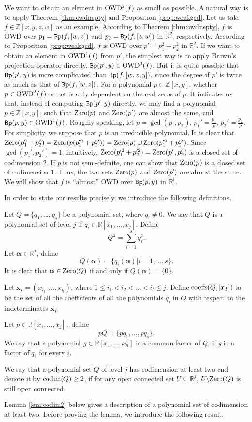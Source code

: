 \documentclass[amsthm]{elsart}
\def \coeffs{{\rm coeffs}}
\def \codim {{\rm codim}}
\def \OWD  {{\rm OWD}}
\def \Bproj  {{\tt Bp}}
\def  \zero {{\rm Zero}}
\def \RR {{\mathbb R}}
\def \ZZ {{\mathbb Z}}
\begin{document}
We want to obtain an element in $\OWD^j(f)$ as small as possible. A natural way is to apply Theorem \ref{thm:owdnepty} and Proposition \ref{prop:weakgcd}. Let us take $f\in\ZZ[x,y,z,w]$ as an example. According to Theorem \ref{thm:owdnepty}, $f$ is OWD over $p_1=\Bproj(f,[w,z])$ and $p_2=\Bproj(f,[z,w])$ in $\RR^2$, respectively. According to Proposition \ref{prop:weakgcd}, $f$ is OWD over $p'=p_1^2+p_2^2$ in $\RR^2$.
If we want to obtain an element in $\OWD^1(f)$ from $p'$, the simplest way is to apply Brown's projection operator directly, $\Bproj(p',y)\in\OWD^1(f)$. But it is quite possible that $\Bproj(p',y)$ is more complicated than $\Bproj(f,[w,z,y])$, since the degree of $p'$ is twice as much as that of $\Bproj(f,[w,z])$.
For a polynomial $p\in\ZZ[x,y]$, whether $p\in\OWD^2(f)$ or not is only dependent on the real zeros of $p$. It indicates us that, instead of computing $\Bproj(p',y)$ directly, we may find a polynomial $p\in\ZZ[x,y]$, such that $\zero(p)$ and $\zero(p')$ are almost the same, and $\Bproj(p,y)\in\OWD^1(f)$. Roughly speaking, let $p=\gcd(p_1,p_2)$, $p_1'=\frac{p_1}{p}$, $p_2'=\frac{p_2}{p}$. For simplicity, we suppose that $p$ is an irreducible polynomial. It is clear that $\zero(p_1^2+p_2^2)=\zero(p(p_1'^2+p_2'^2))=\zero(p)\cup\zero(p_1'^2+p_2'^2)$. Since $\gcd(p_1',p_2')=1$, intuitively, $\zero(p_1'^2+p_2'^2)=\zero(p_1',p_2')$ is a closed set of codimension $2$. If $p$ is not semi-definite, one can show that $\zero(p)$ is a closed set of codimension $1$. Thus, the two sets $\zero(p)$ and $\zero(p')$ are almost the same. We will show that $f$ is ``almost'' OWD over $\Bproj(p,y)$ in $\RR^1$.

In order to state our results precisely, we introduce the following definitions.


\begin{defn}
Let $Q=\{q_1,\ldots,q_s\}$ be a polynomial set, where $q_i\neq0$. We say that $Q$ is a polynomial set of level $j$ if $q_i\in \RR[x_1,\ldots,x_j]$. Define
$$Q^2=\sum_{i=1}^s q_i^2.$$
Let $\bm{\alpha}\in\RR^j$, define
$$Q(\bm{\alpha})=\{q_i(\bm{\alpha})|i=1,\ldots,s\}.$$
It is clear that $\bm{\alpha}\in\zero(Q)$ if and only if $Q(\bm{\alpha})=\{0\}$.

Let $\bm{x}_{I}=(x_{i_1},\ldots,x_{i_l})$, where $1\le i_1<i_2<\ldots<i_l\le j$. Define
$\coeffs(Q,[\bm{x}_{I}])$ to be the set of all the coefficients of all the polynomials $q_i$ in $Q$ with respect to the indeterminates $\bm{x}_{I}$.

Let $p\in\RR[x_1,\ldots,x_j],$ define
$$pQ=\{pq_1,\ldots,pq_s\}.$$
We say that a polynomial $g\in \RR[x_1,\ldots,x_n]$ is a common factor of $Q$, if $g$ is a factor of $q_i$ for every $i$.

We say that a polynomial set $Q$ of level $j$ has codimension at least two and denote it by $\codim(Q)\ge2$, if for any open connected set $U\subseteq\RR^j$, $U\backslash\zero(Q)$ is still open connected.
\end{defn}
Lemma \ref{lem:codim2} below gives a description of a polynomial set of codimension at least two. Before proving the lemma, we introduce the following result.
\end{document}
